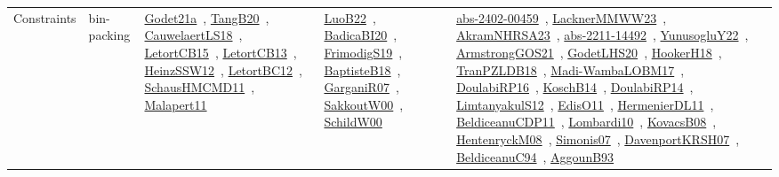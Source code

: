 {\begin{longtable}{lp{3cm}>{\raggedright\arraybackslash}p{6cm}>{\raggedright\arraybackslash}p{6cm}>{\raggedright\arraybackslash}p{8cm}}
Constraints & bin-packing & \href{works/Godet21a.pdf}{Godet21a}~\cite{Godet21a}, \href{works/TangB20.pdf}{TangB20}~\cite{TangB20}, \href{works/CauwelaertLS18.pdf}{CauwelaertLS18}~\cite{CauwelaertLS18}, \href{works/LetortCB15.pdf}{LetortCB15}~\cite{LetortCB15}, \href{works/LetortCB13.pdf}{LetortCB13}~\cite{LetortCB13}, \href{works/HeinzSSW12.pdf}{HeinzSSW12}~\cite{HeinzSSW12}, \href{works/LetortBC12.pdf}{LetortBC12}~\cite{LetortBC12}, \href{works/SchausHMCMD11.pdf}{SchausHMCMD11}~\cite{SchausHMCMD11}, \href{works/Malapert11.pdf}{Malapert11}~\cite{Malapert11} & \href{works/LuoB22.pdf}{LuoB22}~\cite{LuoB22}, \href{works/BadicaBI20.pdf}{BadicaBI20}~\cite{BadicaBI20}, \href{works/FrimodigS19.pdf}{FrimodigS19}~\cite{FrimodigS19}, \href{works/BaptisteB18.pdf}{BaptisteB18}~\cite{BaptisteB18}, \href{works/GarganiR07.pdf}{GarganiR07}~\cite{GarganiR07}, \href{works/SakkoutW00.pdf}{SakkoutW00}~\cite{SakkoutW00}, \href{works/SchildW00.pdf}{SchildW00}~\cite{SchildW00} & \href{works/abs-2402-00459.pdf}{abs-2402-00459}~\cite{abs-2402-00459}, \href{works/LacknerMMWW23.pdf}{LacknerMMWW23}~\cite{LacknerMMWW23}, \href{works/AkramNHRSA23.pdf}{AkramNHRSA23}~\cite{AkramNHRSA23}, \href{works/abs-2211-14492.pdf}{abs-2211-14492}~\cite{abs-2211-14492}, \href{works/YunusogluY22.pdf}{YunusogluY22}~\cite{YunusogluY22}, \href{works/ArmstrongGOS21.pdf}{ArmstrongGOS21}~\cite{ArmstrongGOS21}, \href{works/GodetLHS20.pdf}{GodetLHS20}~\cite{GodetLHS20}, \href{works/HookerH18.pdf}{HookerH18}~\cite{HookerH18}, \href{works/TranPZLDB18.pdf}{TranPZLDB18}~\cite{TranPZLDB18}, \href{works/Madi-WambaLOBM17.pdf}{Madi-WambaLOBM17}~\cite{Madi-WambaLOBM17}, \href{works/DoulabiRP16.pdf}{DoulabiRP16}~\cite{DoulabiRP16}, \href{works/KoschB14.pdf}{KoschB14}~\cite{KoschB14}, \href{works/DoulabiRP14.pdf}{DoulabiRP14}~\cite{DoulabiRP14}, \href{works/LimtanyakulS12.pdf}{LimtanyakulS12}~\cite{LimtanyakulS12}, \href{works/EdisO11.pdf}{EdisO11}~\cite{EdisO11}, \href{works/HermenierDL11.pdf}{HermenierDL11}~\cite{HermenierDL11}, \href{works/BeldiceanuCDP11.pdf}{BeldiceanuCDP11}~\cite{BeldiceanuCDP11}, \href{works/Lombardi10.pdf}{Lombardi10}~\cite{Lombardi10}, \href{works/KovacsB08.pdf}{KovacsB08}~\cite{KovacsB08}, \href{works/HentenryckM08.pdf}{HentenryckM08}~\cite{HentenryckM08}, \href{works/Simonis07.pdf}{Simonis07}~\cite{Simonis07}, \href{works/DavenportKRSH07.pdf}{DavenportKRSH07}~\cite{DavenportKRSH07}, \href{works/BeldiceanuC94.pdf}{BeldiceanuC94}~\cite{BeldiceanuC94}, \href{works/AggounB93.pdf}{AggounB93}~\cite{AggounB93}\\

\end{longtable}}
